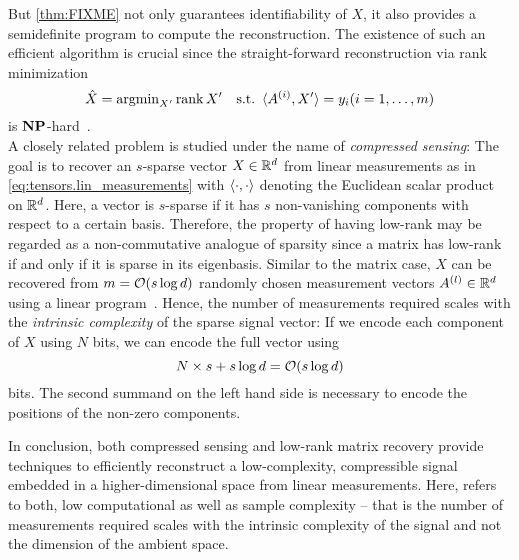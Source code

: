 But \cref{thm:FIXME} not only guarantees identifiability of $X$, it also provides a semidefinite program to compute the reconstruction.
The existence of such an efficient algorithm is crucial since the straight-forward reconstruction via rank minimization
\[
  \hat{X} = \operatorname{argmin}_{X'} \operatorname{rank} X' \quad\mathrm{s.t.}\ \braket{A^{(i)}, X'} = y_i (i = 1, \ldots, m)
\]
is $\mathbf{NP}$-hard~\cite{Mesbahi}.\\

A closely related problem is studied under the name of \emph{compressed sensing}:
The goal is to recover an $s$-sparse vector $X \in {\mathbb{R}}^d$ from linear measurements as in \cref{eq:tensors.lin_measurements} with $\braket{\cdot, \cdot}$ denoting the Euclidean scalar product on ${\mathbb{R}}^d$.
Here, a vector is $s$-sparse if it has $s$ non-vanishing components with respect to a certain basis.
Therefore, the property of having low-rank may be regarded as a non-commutative analogue of sparsity since a matrix has low-rank if and only if it is sparse in its eigenbasis.
Similar to the matrix case, $X$ can be recovered from $m = {\mathcal{O}}(s \log d)$ randomly chosen measurement vectors $A^{(l)} \in {\mathbb{R}}^d$ using a linear program~\cite{Foucart_2013_Mathematical}.
Hence, the number of measurements required scales with the \emph{intrinsic complexity} of the sparse signal vector:
If we encode each component of $X$ using $N$ bits, we can encode the full vector using
\[
  N \times s + s \log d = {\mathcal{O}}(s \log d)
\]
bits.
The second summand on the left hand side is necessary to encode the positions of the non-zero components.

In conclusion, both compressed sensing and low-rank matrix recovery provide techniques to efficiently reconstruct a low-complexity, compressible signal embedded in a higher-dimensional space from linear measurements.
Here,  refers to both, low computational as well as sample complexity -- that is the number of measurements required scales with the intrinsic complexity of the signal and not the dimension of the ambient space.\\




